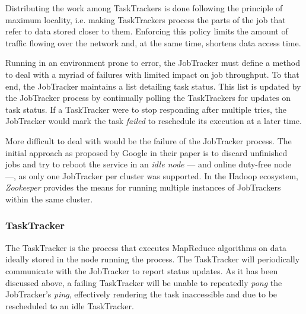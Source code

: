 Distributing the work among TaskTrackers is done following the principle of maximum locality, i.e. making TaskTrackers process the parts of the job that refer to data stored closer to them. Enforcing this policy limits the amount of traffic flowing over the network and, at the same time, shortens data access time.

Running in an environment prone to error, the JobTracker must define a method to deal with a myriad of failures with limited impact on job throughput. To that end, the JobTracker maintains a list detailing task status. This list is updated by the JobTracker process by continually polling the TaskTrackers for updates on task status. If a TaskTracker were to stop responding after multiple tries, the JobTracker would mark the task \emph{failed} to reschedule its execution at a later time.

More difficult to deal with would be the failure of the JobTracker process. The initial approach as proposed by Google in their paper \cite{googlemapreduce} is to discard unfinished jobs and try to reboot the service in an \emph{idle node} --- and online duty-free node ---, as only one JobTracker per cluster was supported. In the Hadoop ecosystem, \emph{Zookeeper} provides the means for running multiple instances of JobTrackers within the same cluster.

\subsubsection{TaskTracker}\label{subsubsec:tasktracker}
\noindent The TaskTracker is the process that executes MapReduce algorithms on data ideally stored in the node running the process. The TaskTracker will periodically communicate with the JobTracker to report status updates. As it has been discussed above, a failing TaskTracker will be unable to repeatedly \emph{pong} the JobTracker's \emph{ping}, effectively rendering the task inaccessible and due to be rescheduled to an idle TaskTracker.
